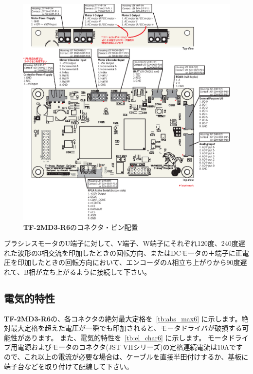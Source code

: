 \documentclass[11pt,a4j,openany,fleqn]{jbook}
\begin{document}
\begin{figure}[H]
\centering\includegraphics[width=160mm]{pin-description-r6.eps}
\caption{{\bf TF-2MD3-R6}のコネクタ・ピン配置}
\label{fig:connector6}
\end{figure}

ブラシレスモータのU端子に対して、V端子、W端子にそれぞれ120度、240度遅れた波形の3相交流を印加したときの回転方向、またはDCモータの＋端子に正電圧を印加したときの回転方向において、エンコーダのA相立ち上がりから90度遅れて、B相が立ち上がるように接続して下さい。
\par


\subsection{電気的特性}
\label{sec:電気的特性}

{\bf TF-2MD3-R6}の、各コネクタの絶対最大定格を\tablename~\ref{tb:abs_max6} に示します。絶対最大定格を超えた電圧が一瞬でも印加されると、モータドライバが破損する可能性があります。
また、電気的特性を\tablename~\ref{tb:el_char6} に示します。
モータドライブ用電源およびモータのコネクタ(JST VHシリーズ)の定格連続電流は10Aですので、これ以上の電流が必要な場合は、ケーブルを直接半田付けするか、基板に端子台などを取り付けて配線して下さい。\par
\end{document}
